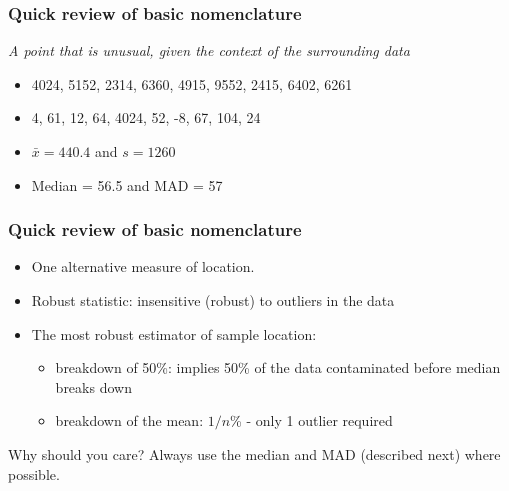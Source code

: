 \begin{frame}\frametitle{Quick review of basic nomenclature}
	\begin{block}
		{}
		\begin{center}
			\emph{A point that is unusual, given the context of the surrounding data}
		\end{center}
	\end{block}
	\begin{itemize}
		\item	4024, 5152, 2314, 6360, 4915, 9552, 2415, 6402, 6261
		\item	4, 61, 12, 64, 4024, 52, -8, 67, 104, 24
	\end{itemize}

	\vspace{12pt}
	\begin{itemize}
		\item	$\bar{x} = 440.4$  and $s = 1260$
		\item	Median = 56.5 and MAD = 57
	\end{itemize}
\end{frame}

\begin{frame}\frametitle{Quick review of basic nomenclature}
	{}
	\begin{itemize}
		\item	One alternative measure of location.
		\item	Robust statistic: insensitive (robust) to outliers in the data
		\item	The most robust estimator of sample location:
		\begin{itemize}
			\item	breakdown of 50\%: implies 50\% of the data contaminated before median breaks down
			\item	breakdown of the mean: $1/n$\% - only 1 outlier required
		\end{itemize}
	\end{itemize}
	\begin{exampleblock}{Why should you care?}
		Always use the median and MAD (described next) where possible.
	\end{exampleblock}
\end{frame}


